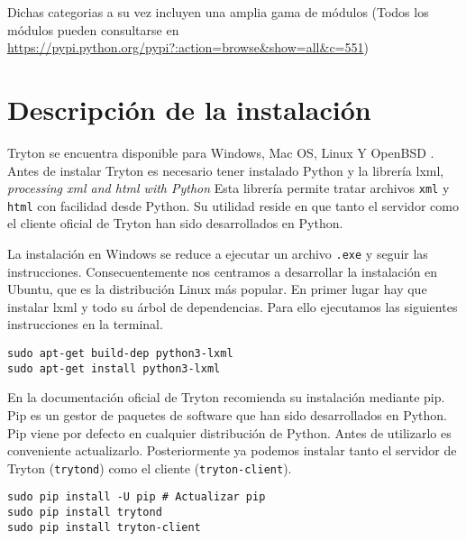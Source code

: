 \documentclass{article}
\begin{document}
Dichas categorias a su vez incluyen una amplia gama de módulos (Todos los módulos pueden consultarse en \url{https://pypi.python.org/pypi?:action=browse&show=all&c=551})


\section{Descripción de la instalación}

Tryton se encuentra disponible para Windows, Mac OS, Linux Y OpenBSD \cite{descarga}. Antes de instalar Tryton es necesario tener instalado Python y la librería lxml, \emph{processing xml and html with Python} \cite{lxml} Esta librería permite tratar archivos \texttt{xml} y \texttt{html} con facilidad desde Python. Su utilidad reside en que tanto el servidor como el cliente oficial de Tryton han sido desarrollados en Python.

La instalación en Windows se reduce a ejecutar un archivo \texttt{.exe} y seguir las instrucciones. Consecuentemente nos centramos a desarrollar la instalación en Ubuntu, que es la distribución Linux más popular. En primer lugar hay que instalar lxml y todo su árbol de dependencias. Para ello ejecutamos las siguientes instrucciones en la terminal.

\begin{verbatim}
sudo apt-get build-dep python3-lxml
sudo apt-get install python3-lxml
\end{verbatim}

En la documentación oficial de Tryton recomienda su instalación mediante pip. Pip es un gestor de paquetes de software que han sido desarrollados en Python.  Pip viene por defecto en cualquier distribución de Python. Antes de utilizarlo es conveniente actualizarlo. Posteriormente ya podemos instalar tanto el servidor de Tryton (\texttt{trytond}) como el cliente (\texttt{tryton-client}).

\begin{verbatim}
sudo pip install -U pip # Actualizar pip
sudo pip install trytond
sudo pip install tryton-client
\end{verbatim}
\end{document}

